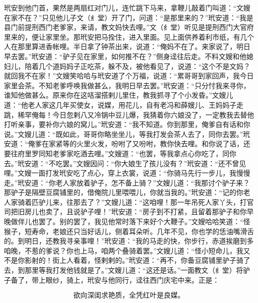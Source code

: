 玳安到他门首，果然是两扇红对门儿，连忙跳下马来，拿鞭儿敲着门叫道：“文嫂在家不在？”只见他儿子文（纟堂）开了门，问道：“是那里来的？”玳安道：“我是县门前提刑西门老爹家，来请，教文妈快去哩。”文（纟堂）听见是提刑西门大官府里来的，便让家里坐。那玳安把马拴住，进入里面。见上面供养着利市纸，有几个人在那里算进香帐哩。半日拿了钟茶出来，说道：“俺妈不在了。来家说了，明日早去罢。”玳安道：“驴子见在家里，如何推不在？”侧身迳往后走。不料文嫂和他媳妇儿，陪着几个道妈妈子正吃茶，躲不及，被他看见了，说道：“这个不是文妈？就回我不在家！”文嫂笑哈哈与玳安道了个万福，说道：“累哥哥到家回声，我今日家里会茶。不知老爹呼唤我做甚么，我明日早去罢。”玳安道：“只分忖我来寻你，谁知他做甚么。原来你在这咭溜搭剌儿里住，教我抓寻了个小发昏。”文嫂儿道：“他老人家这几年买使女，说媒，用花儿，自有老冯和薛嫂儿、王妈妈子走跳，稀罕俺每！今日忽剌八又冷锅中豆儿爆，我猜着你六娘没了，一定教我去替他打听亲事，要补你六娘的窝儿。”玳安道：“我不知道。你到那里，俺爹自有话和你说。”文嫂儿道：“既如此，哥哥你略坐坐儿，等我打发会茶人去了，同你去罢。”玳安道：“俺爹在家紧等的火里火发，吩咐了又吩咐，教你快去哩。和你说了话，还要往府里罗同知老爹家吃酒去哩。”文嫂道：“也罢，等我拿点心你吃了，同你去。”玳安道：“不吃罢。”文嫂因问：“你大娘生了孩儿没有？”玳安道：“还不曾见哩。”文嫂一面打发玳安吃了点心，穿上衣裳，说道：“你骑马先行一步儿，我慢慢走。”玳安道：“你老人家放着驴子，怎不备上骑？”文嫂儿道：“我那讨个驴子来？那驴子是隔壁豆腐铺里的，借俺院儿里喂喂儿，你就当我的。”玳安道：“记的你老人家骑着匹驴儿来，往那去了？”文嫂儿道：“这咱哩！那一年吊死人家丫头，打官司把旧房儿也卖了，且说驴子哩！”玳安道：“房子到不打紧，且留着那驴子和你早晚做伴儿也罢了。别的罢了，我见他常时落下来好个大鞭子。”文嫂哈哈笑道：“怪猴子，短寿命，老娘还只当好话儿，侧着耳朵听。几年不见，你也学的恁油嘴滑舌的。到明日，还教我寻亲事哩！”玳安道：“我的马走的快，你步行，赤道挨磨到多咱晚，不惹的爹说？你也上马，咱两个叠骑着罢。”文嫂儿道：“怪小短命儿，我又不是你影射的！街上人看着，怪剌剌的。”玳安道：“再不，你备豆腐铺里驴子骑了去，到那里等我打发他钱就是了。”文嫂儿道：“这还是话。”一面教文（纟堂）将驴子备了，带上眼纱，骑上，玳安与他同行，迳往西门庆宅中来。正是：

\[
欲向深闺求艳质，全凭红叶是良媒。
\]

